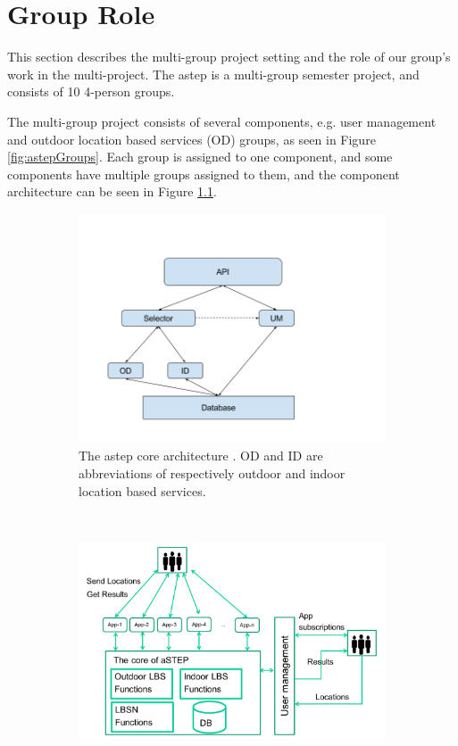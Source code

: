 \chapter{Group Role}
This section describes the multi-group project setting and the role of our group’s work in the multi-project.
The \gls{astep} is a multi-group semester project, and consists of 10 4-person groups. 

The multi-group project consists of several components, e.g. user management and outdoor location based services (OD) groups, as seen in Figure \ref{fig:astepGroups}.
Each group is assigned to one component, and some components have multiple groups assigned to them, and the component architecture can be seen in Figure \ref{fig:astepCore}.


\begin{figure}[h!]
	\centering
	\begin{subfigure}[b]{0.48\textwidth}
		\includegraphics[width=\textwidth]{figures/InformalArchitecture.png}
		\caption{The \gls{astep} core architecture \cite{astepArchitectureImage}. OD and ID are abbreviations of respectively outdoor and indoor location based services.}
		\label{fig:astepCore}
	\end{subfigure}
	~ %
	\begin{subfigure}[b]{0.48\textwidth}
		\includegraphics[width=\textwidth]{figures/astepGroups.png}

\end{subfigure}
\end{figure}
